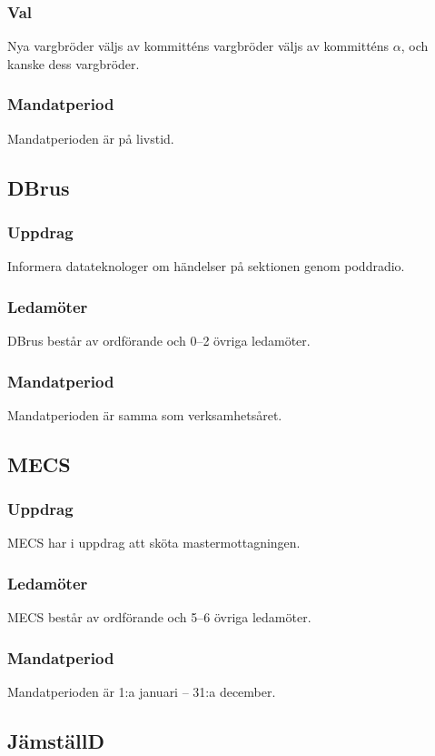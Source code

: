 \subsubsection{Val}
Nya vargbröder väljs av kommitténs vargbröder väljs av kommitténs $\alpha$, och kanske dess vargbröder.
\subsubsection{Mandatperiod}
Mandatperioden är på livstid.

\subsection{DBrus}
\subsubsection{Uppdrag}
Informera datateknologer om händelser på sektionen genom poddradio.
\subsubsection{Ledamöter}
DBrus består av ordförande och 0--2 övriga ledamöter.
\subsubsection{Mandatperiod}
Mandatperioden är samma som verksamhetsåret.

\subsection{MECS}
\subsubsection{Uppdrag}
MECS har i uppdrag att sköta mastermottagningen.
\subsubsection{Ledamöter}
MECS består av ordförande och 5--6 övriga ledamöter.
\subsubsection{Mandatperiod}
Mandatperioden är 1:a januari -- 31:a december.

\subsection{JämställD}
